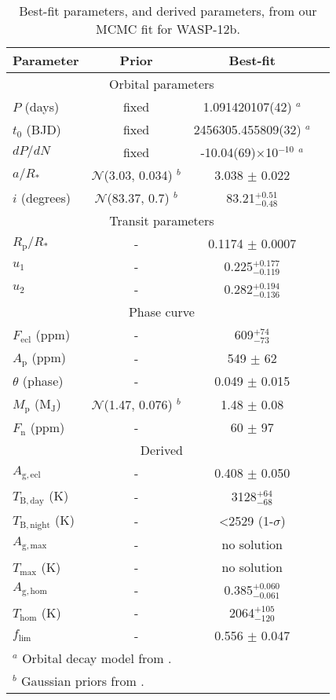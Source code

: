 \documentclass[fleqn,usenatbib]{mnras}
\begin{document}
\begin{table}
	\centering
	\caption{Best-fit parameters, and derived parameters, from our MCMC fit for WASP-12b.}
	\label{tab:results}
	\begin{tabular}{lccr}
		\hline\hline
		Parameter & Prior & Best-fit\\
		\hline
		\multicolumn{3}{c}{Orbital parameters} \\
		\hline
		$P$ (days) & fixed & 1.091420107(42) $^a$\\
		\rule{0pt}{3.5ex}$t_{\mathrm{0}}$ (BJD) & fixed & 2456305.455809(32) $^a$\\
		\rule{0pt}{3.5ex}$dP/dN$ & fixed & -10.04(69)$\times$10$^{-10}$ $^a$\\
		\rule{0pt}{3.5ex}$a/R_{*}$ & $\mathcal{N}$(3.03, 0.034) $^b$ & 3.038 $\pm$ 0.022\\
		\rule{0pt}{3.5ex}$i$ (degrees) & $\mathcal{N}$(83.37, 0.7) $^b$ & 83.21$^{+0.51}_{-0.48}$\\
		\hline
		\multicolumn{3}{c}{Transit parameters} \\
		\hline
		$R_{\mathrm{p}}/R_{*}$ & - & 0.1174 $\pm$ 0.0007\\
	    \rule{0pt}{3.5ex}$u_{1}$ & - & 0.225$^{+0.177}_{-0.119}$\\
	    \rule{0pt}{3.5ex}$u_{2}$ & - & 0.282$^{+0.194}_{-0.136}$\\
	    \hline
	    \multicolumn{3}{c}{Phase curve} \\
	    \hline
	    $F_{\mathrm{ecl}}$ (ppm) & - & 609$^{+74}_{-73}$\\
	    \rule{0pt}{3.5ex}$A_{\mathrm{p}}$ (ppm) & - & 549 $\pm$ 62\\
	    \rule{0pt}{3.5ex}$\theta$ (phase) & - & 0.049 $\pm$ 0.015\\
	    \rule{0pt}{3.5ex}$M_{\mathrm{p}}$ (M$_{\mathrm{J}}$) & $\mathcal{N}$(1.47, 0.076) $^b$ & 1.48 $\pm$ 0.08\\
	    \rule{0pt}{3.5ex}$F_{\mathrm{n}}$ (ppm) & - & 60 $\pm$ 97\\
		\hline
		\multicolumn{3}{c}{Derived} \\
		\hline
		$A_{\mathrm{g, ecl}}$ & - & 0.408 $\pm$ 0.050\\
		\rule{0pt}{3.5ex}$T_{\mathrm{B,day}}$ (K) & - & 3128$^{+64}_{-68}$\\
		\rule{0pt}{3.5ex}$T_{\mathrm{B,night}}$ (K) & - & <2529 (1-$\sigma$)\\
		\rule{0pt}{3.5ex}$A_{\mathrm{g, max}}$ & - & no solution\\
		\rule{0pt}{3.5ex}$T_{\mathrm{max}}$ (K) & - & no solution\\
		\rule{0pt}{3.5ex}$A_{\mathrm{g, hom}}$ & - & 0.385$^{+0.060}_{-0.061}$\\
		\rule{0pt}{3.5ex}$T_{\mathrm{hom}}$ (K) & - & 2064$^{+105}_{-120}$\\
		\rule{0pt}{3.5ex}$f_{\mathrm{lim}}$ & - & 0.556 $\pm$ 0.047\\
		\hline
		\multicolumn{3}{l}{\footnotesize$^a$ Orbital decay model from \citet{orbitdecay}.} \\
		\multicolumn{3}{l}{\footnotesize$^b$ Gaussian priors from \citet{collinsmass}.}
	\end{tabular}
	

\end{table}
\end{document}
